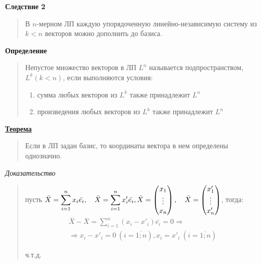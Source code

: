\documentclass[11pt]{proc}
\begin{document}
	\textbf{Следствие 2}
	\begin{quote}
		В $n$-мерном ЛП каждую упорядоченную линейно-независимую систему из $k<n$ векторов можно дополнить до базиса.
	\end{quote}
	\pagebreak
	\textbf{Определение}
	\begin{quote}
		Непустое множество векторов в ЛП $L^n$ называется подпространством, $L^k(k<n)$, если выполняются условия:
		\begin{enumerate}
			\item{сумма любых векторов из $L^k$ также принадлежит $L^n$}
			\item{произведения любых векторов из $L^k$ также принадлежит $L^n$}
		\end{enumerate}
	\end{quote}
	\underline{\textbf{Теорема}}
	\begin{quote}
		Если в ЛП задан базис, то координаты вектора в нем определены однозначно.
	\end{quote}
	\emph{Доказательство}
	\begin{quote}
		пусть $\displaystyle \bar{X}=\sum^n_{i=1}x_i\bar{e_i},\quad\bar{X}=\sum^n_{i=1}x'_i\bar{e_i},\\ \bar{X}=\begin{pmatrix}x_1 \\ \vdots \\ x_n\end{pmatrix}, \quad\bar{X}=\begin{pmatrix}x'_1 \\ \vdots \\ x'_n\end{pmatrix}$, тогда:
		\begin{multline*}
			\bar{X}-\bar{X}=\sum^n_{i=1}(x_i-x'_i)\bar{e_i}=0 \Rightarrow \\ \Rightarrow x_i-x'_i=0\ (i=\overline{1;n}),
			x_i=x'_i\ (i=\overline{1;n})
		\end{multline*}
		\begin{flushright}ч.т.д.\end{flushright}
	\end{quote}
\end{document}

